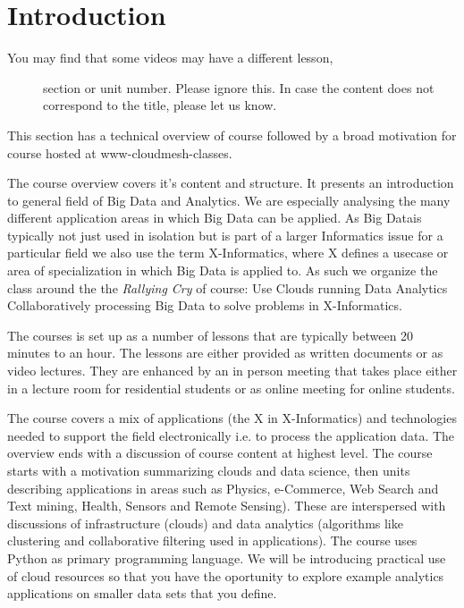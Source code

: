 \begin{fileremark}\currfiledir \currfilename\end{fileremark}

\section{Introduction}\label{introduction}

\begin{description}
\item[You may find that some videos may have a different lesson,]
section or unit number. Please ignore this. In case the content does not
correspond to the title, please let us know.
\end{description}

This section has a technical overview of course followed by a broad
motivation for course hosted at www-cloudmesh-classes.

The course overview covers it's content and structure. It presents an
introduction to general field of Big Data and Analytics. We are
especially analysing the many different application areas in which Big
Data can be applied. As Big Datais typically not just used in isolation
but is part of a larger Informatics issue for a particular field we also
use the term X-Informatics, where X defines a usecase or area of
specialization in which Big Data is applied to. As such we organize the
class around the the \emph{Rallying Cry} of course: Use Clouds running
Data Analytics Collaboratively processing Big Data to solve problems in
X-Informatics.

The courses is set up as a number of lessons that are typically between
20 minutes to an hour. The lessons are either provided as written
documents or as video lectures. They are enhanced by an in person
meeting that takes place either in a lecture room for residential
students or as online meeting for online students.

The course covers a mix of applications (the X in X-Informatics) and
technologies needed to support the field electronically i.e. to process
the application data. The overview ends with a discussion of course
content at highest level. The course starts with a motivation
summarizing clouds and data science, then units describing applications
in areas such as Physics, e-Commerce, Web Search and Text mining,
Health, Sensors and Remote Sensing). These are interspersed with
discussions of infrastructure (clouds) and data analytics (algorithms
like clustering and collaborative filtering used in applications). The
course uses Python as primary programming language. We will be
introducing practical use of cloud resources so that you have the
oportunity to explore example analytics applications on smaller data
sets that you define.

